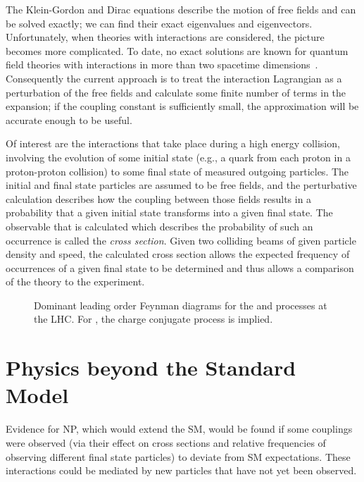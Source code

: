 The Klein-Gordon and Dirac equations describe the motion of free fields and can
be solved exactly; we can find their exact eigenvalues and eigenvectors.
Unfortunately, when theories with interactions are considered, the picture
becomes more complicated. To date, no exact solutions are known for quantum
field theories with interactions in more than two spacetime
dimensions~\cite{Peskin:1995ev}. Consequently the current approach is to treat
the interaction Lagrangian as a perturbation of the free fields and calculate
some finite number of terms in the expansion; if the coupling constant is
sufficiently small, the approximation will be accurate enough to be  useful.

Of interest are the interactions that take place during a high energy collision,
involving the evolution of some initial state (e.g., a quark from each proton in
a proton-proton collision) to some final state of measured outgoing particles.
The initial and final state particles are assumed to be free fields, and the
perturbative calculation describes how the coupling between those fields results
in a probability that a given initial state transforms into a given final state.
The observable that is calculated which describes the probability of such an
occurrence is called the \textit{cross section}. Given two colliding beams of
given particle density and speed, the calculated cross section allows the
expected frequency of occurrences of a given final state to be determined and
thus allows a comparison of the theory to the experiment.

\begin{figure}[tb]
  
  \caption[Representative Feynman diagrams for \ttZ and \ttW]{
    Dominant leading order Feynman diagrams for the  \ttZ and
     \ttW processes at the LHC. For , the charge
    conjugate process is implied.
  }
  \label{fig:ttV}
\end{figure}

\section{Physics beyond the Standard Model}
Evidence for NP, which would extend the SM, would be found if some couplings
were observed (via their effect on cross sections and relative frequencies of
observing different final state particles) to deviate from SM expectations.
These interactions could be mediated by new particles that have not yet been
observed.


